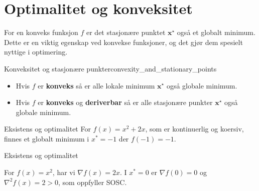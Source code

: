 \section{Optimalitet og konveksitet}
\label{sec:optimality_and_convexity}
For en konveks funksjon \(f\) er det stasjonære punktet \(\mathbf{x}^\star\) også et globalt minimum. Dette er en viktig egenskap ved konvekse funksjoner, og det gjør dem spesielt nyttige i optimering.

\begin{remark}{Konveksitet og stasjonære punkter}{convexity_and_stationary_points}
	\begin{itemize}
		\item Hvis \(f\) er \textbf{konveks} så er alle lokale minimum \(\mathbf{x}^\star\) også globale minimum.
		\item Hvis \(f\) er \textbf{konveks} og \textbf{deriverbar} så er alle stasjonære punkter \(\mathbf{x}^\star\) også globale minimum.
	\end{itemize}
\end{remark}

\begin{example}{Eksistens og optimalitet}{}
	For \( f(x) = x^2 + 2x \), som er kontinuerlig og koersiv, finnes et globalt minimum i \( x^* = -1 \) der \( f(-1) = -1 \).
\end{example}
\begin{example}{Eksistens og optimalitet}{}

	For \( f(x) = x^2 \), har vi \( \nabla f(x) = 2x \). I \( x^* = 0 \) er \( \nabla f(0) = 0 \) og \( \nabla^2 f(x) = 2 > 0 \), som oppfyller SOSC.

\end{example}
